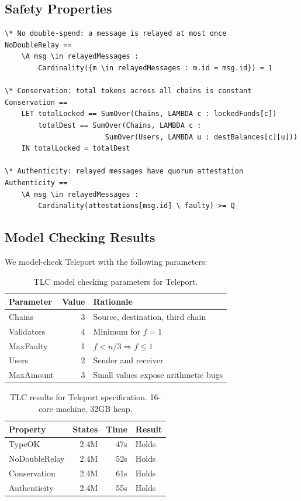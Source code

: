 \documentclass[11pt,a4paper]{article}
\begin{document}
\subsection{Safety Properties}

\begin{lstlisting}[language=TLA,caption={Teleport safety properties}]
\* No double-spend: a message is relayed at most once
NoDoubleRelay ==
    \A msg \in relayedMessages :
        Cardinality({m \in relayedMessages : m.id = msg.id}) = 1

\* Conservation: total tokens across all chains is constant
Conservation ==
    LET totalLocked == SumOver(Chains, LAMBDA c : lockedFunds[c])
        totalDest == SumOver(Chains, LAMBDA c :
                        SumOver(Users, LAMBDA u : destBalances[c][u]))
    IN totalLocked = totalDest

\* Authenticity: relayed messages have quorum attestation
Authenticity ==
    \A msg \in relayedMessages :
        Cardinality(attestations[msg.id] \ faulty) >= Q
\end{lstlisting}

\subsection{Model Checking Results}

We model-check Teleport with the following parameters:

\begin{table}[H]
\centering
\small
\begin{tabular}{@{}lrl@{}}
\toprule
\textbf{Parameter} & \textbf{Value} & \textbf{Rationale} \\
\midrule
Chains & 3 & Source, destination, third chain \\
Validators & 4 & Minimum for $f = 1$ \\
MaxFaulty & 1 & $f < n/3 \Rightarrow f \leq 1$ \\
Users & 2 & Sender and receiver \\
MaxAmount & 3 & Small values expose arithmetic bugs \\
\bottomrule
\end{tabular}
\caption{TLC model checking parameters for Teleport.}
\end{table}

\begin{table}[H]
\centering
\small
\begin{tabular}{@{}lrrl@{}}
\toprule
\textbf{Property} & \textbf{States} & \textbf{Time} & \textbf{Result} \\
\midrule
TypeOK & 2.4M & 47s & Holds \\
NoDoubleRelay & 2.4M & 52s & Holds \\
Conservation & 2.4M & 61s & Holds \\
Authenticity & 2.4M & 55s & Holds \\
\bottomrule
\end{tabular}
\caption{TLC results for Teleport specification. 16-core machine, 32GB heap.}
\end{table}
\end{document}
